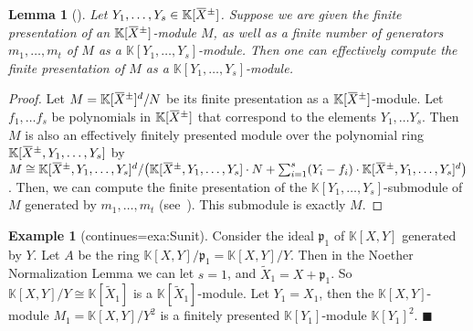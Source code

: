 \documentclass[a4paper,UKenglish,cleveref, autoref, thm-restate]{lipics-v2021}
\newcommand{\K}{\mathbb{K}}
\newcommand{\oX}{\mkern 1.5mu\overline{\mkern-1.5mu X \mkern-1.5mu}\mkern 1.5mu}
\newcommand{\frp}{\mathfrak{p}}
\newtheorem{lem}[thrm]{Lemma}
\theoremstyle{definition}
\theoremstyle{definition}
\newtheorem{exmpl}[thrm]{Example}
\theoremstyle{definition}
\begin{document}
\begin{lem}[{\cite[Section~2]{baumslag1981computable}}]\label{lem:eff}
    Let $Y_1, \ldots, Y_s \in \K[\oX^{\pm}]$.
    Suppose we are given the finite presentation of an $\K[\oX^{\pm}]$-module $M$, as well as a finite number of generators $m_1, \ldots, m_t$ of $M$ as a $\K[Y_1, \ldots, Y_s]$-module.
    Then one can effectively compute the finite presentation of $M$ as a $\K[Y_1, \ldots, Y_s]$-module.
\end{lem}
\begin{proof}
    Let $M = \K[\oX^{\pm}]^d/N$ be its finite presentation as a $\K[\oX^{\pm}]$-module.
    Let $f_1, \ldots f_s$ be polynomials in $\K[\oX^{\pm}]$ that correspond to the elements $Y_1, \ldots Y_s$.
    Then $M$ is also an effectively finitely presented module over the polynomial ring $\K[\oX^{\pm}, Y_1, \ldots, Y_s]$ by 
    $M \cong \K[\oX^{\pm}, Y_1, \ldots, Y_s]^d/\big(\K[\oX^{\pm}, Y_1, \ldots, Y_s] \cdot N + \sum_{i = 1}^s (Y_i - f_i) \cdot \K[\oX^{\pm}, Y_1, \ldots, Y_s]^d \big)$.
    Then, we can compute the finite presentation of the $\K[Y_1, \ldots, Y_s]$-submodule of $M$ generated by $m_1, \ldots, m_t$ (see~\cite[Corollary~2.5]{baumslag1981computable}).
    This submodule is exactly $M$.
\end{proof}

\renewcommand\thmcontinues[1]{continued}
\begin{exmpl}[continues=exa:Sunit]
Consider the ideal $\frp_1$ of $\K[X, Y]$ generated by $Y$.
Let $A$ be the ring $\K[X, Y]/\frp_1 = \K[X, Y]/Y$.
Then in the Noether Normalization Lemma we can let $s = 1$, and $\widetilde{X}_1 = X + \frp_1$. So $\K[X, Y]/Y \cong \K[\widetilde{X}_1]$ is a $\K[\widetilde{X}_1]$-module.
Let $Y_1 = X_1$, then the $\K[X, Y]$-module $M_1 = \K[X, Y]/Y^2$ is a finitely presented $\K[Y_1]$-module $\K[Y_1]^2$.
\hfill $\blacksquare$
\end{exmpl}
\end{document}
